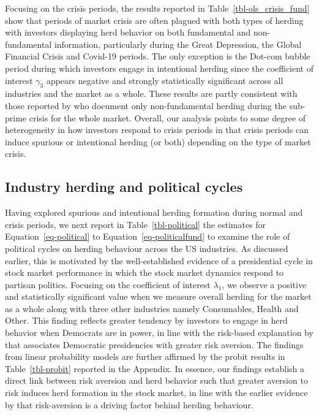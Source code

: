 \documentclass[
  letterpaper,
  DIV=11,
  numbers=noendperiod]{scrartcl}
\begin{document}
Focusing on the crisis periods, the results reported in
Table~\ref{tbl-ols_crisis_fund} show that periods of market crisis are
often plagued with both types of herding with investors displaying herd
behavior on both fundamental and non-fundamental information,
particularly during the Great Depression, the Global Financial Crisis
and Covid-19 periods. The only exception is the Dot-com bubble period
during which investors engage in intentional herding since the
coefficient of interest \(\gamma_3\) appears negative and strongly
statistically significant across all industries and the market as a
whole. These results are partly consistent with those reported by
\citet{galariotis2015herding} who document only non-fundamental herding
during the sub-prime crisis for the whole market. Overall, our analysis
points to some degree of heterogeneity in how investors respond to
crisis periods in that crisis periods can induce spurious or intentional
herding (or both) depending on the type of market crisis.

\subsection{Industry herding and political
cycles}\label{industry-herding-and-political-cycles-1}

Having explored spurious and intentional herding formation during normal
and crisis periods, we next report in Table~\ref{tbl-political} the
estimates for Equation~\ref{eq-political} to
Equation~\ref{eq-politicalfund} to examine the role of political cycles
on herding behaviour across the US industries. As discussed earlier,
this is motivated by the well-established evidence of a presidential
cycle in stock market performance in which the stock market dynamics
respond to partisan politics. Focusing on the coefficient of interest
\(\lambda_1\), we observe a positive and statistically significant value
when we measure overall herding for the market as a whole along with
three other industries namely Consumables, Health and Other. This
finding reflects greater tendency by investors to engage in herd
behavior when Democrats are in power, in line with the risk-based
explanation by \citet{pastor2020political} that associates Democratic
presidencies with greater risk aversion. The findings from linear
probability models are further affirmed by the probit results in
Table~\ref{tbl-probit} reported in the Appendix. In essence, our
findings establish a direct link between risk aversion and herd behavior
such that greater aversion to risk induces herd formation in the stock
market, in line with the earlier evidence by \citet{nath2020investor}
that risk-aversion is a driving factor behind herding behaviour.
\end{document}
